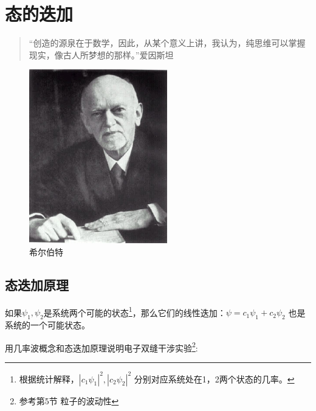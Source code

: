 \section{态的迭加}

\begin{quotation}
``创造的源泉在于数学，因此，从某个意义上讲，我认为，纯思维可以掌握现实，像古人所梦想的那样。''\qquad 爱因斯坦
\end{quotation}


\begin{figure}[h]
\begin{center}
\includegraphics[clip,width=6cm]{WaveFunction/hilbert.ps}
\caption{希尔伯特}
\end{center}
\end{figure}

\subsection{态迭加原理}

如果$\psi _1 ,\psi _2 $是系统两个可能的状态\footnote{根据统计解释，$\left| {c_1 \psi _1 } \right|^2 ,\left| {c_2 \psi _2 } \right|^2 $
分别对应系统处在1，2两个状态的几率。}，那么它们的线性迭加：$\psi  = c_1 \psi _1  + c_2 \psi _2 $
也是系统的一个可能状态。

用几率波概念和态迭加原理说明电子双缝干涉实验\footnote{参考第5节 粒子的波动性}:


